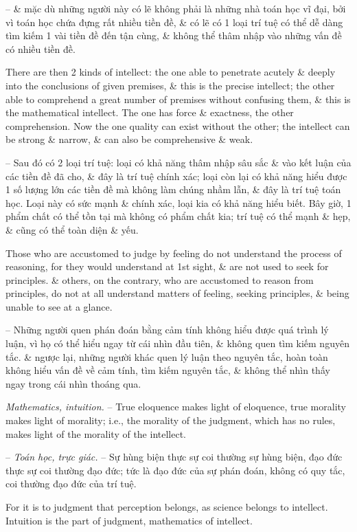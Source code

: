\documentclass{article}
\begin{document}
\begin{enumerate}
\begin{itemize}
		-- \& mặc dù những người này có lẽ không phải là những nhà toán học vĩ đại, bởi vì toán học chứa đựng rất nhiều tiền đề, \& có lẽ có 1 loại trí tuệ có thể dễ dàng tìm kiếm 1 vài tiền đề đến tận cùng, \& không thể thâm nhập vào những vấn đề có nhiều tiền đề.
		
		There are then 2 kinds of intellect: the one able to penetrate acutely \& deeply into the conclusions of given premises, \& this is the precise intellect; the other able to comprehend a great number of premises without confusing them, \& this is the mathematical intellect. The one has force \& exactness, the other comprehension. Now the one quality can exist without the other; the intellect can be strong \& narrow, \& can also be comprehensive \& weak.
		
		-- Sau đó có 2 loại trí tuệ: loại có khả năng thâm nhập sâu sắc \& vào kết luận của các tiền đề đã cho, \& đây là trí tuệ chính xác; loại còn lại có khả năng hiểu được 1 số lượng lớn các tiền đề mà không làm chúng nhầm lẫn, \& đây là trí tuệ toán học. Loại này có sức mạnh \& chính xác, loại kia có khả năng hiểu biết. Bây giờ, 1 phẩm chất có thể tồn tại mà không có phẩm chất kia; trí tuệ có thể mạnh \& hẹp, \& cũng có thể toàn diện \& yếu.
		
		 Those who are accustomed to judge by feeling do not understand the process of reasoning, for they would understand at 1st sight, \& are not used to seek for principles. \& others, on the contrary, who are accustomed to reason from principles, do not at all understand matters of feeling, seeking principles, \& being unable to see at a glance.
		
		-- Những người quen phán đoán bằng cảm tính không hiểu được quá trình lý luận, vì họ có thể hiểu ngay từ cái nhìn đầu tiên, \& không quen tìm kiếm nguyên tắc. \& ngược lại, những người khác quen lý luận theo nguyên tắc, hoàn toàn không hiểu vấn đề về cảm tính, tìm kiếm nguyên tắc, \& không thể nhìn thấy ngay trong cái nhìn thoáng qua.
		
		 {\it Mathematics, intuition.} -- True eloquence makes light of eloquence, true morality makes light of morality; i.e., the morality of the judgment, which has no rules, makes light of the morality of the intellect.
		
		-- {\it Toán học, trực giác.} -- Sự hùng biện thực sự coi thường sự hùng biện, đạo đức thực sự coi thường đạo đức; tức là đạo đức của sự phán đoán, không có quy tắc, coi thường đạo đức của trí tuệ.
		
		For it is to judgment that perception belongs, as science belongs to intellect. Intuition is the part of judgment, mathematics of intellect.
		

\end{itemize}
\end{enumerate}
\end{document}
